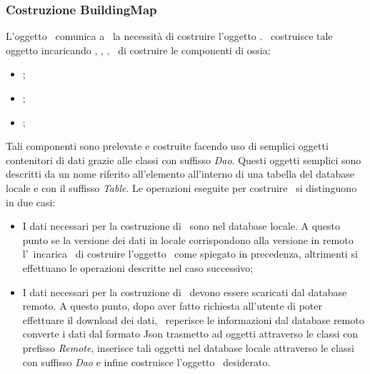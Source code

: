 \documentclass[../Funzionalita.tex]{subfiles}
\begin{document}
		\newpage	
		\subsubsection{Costruzione BuildingMap}
			L'oggetto \InformationManagerImp\ comunica a \DatabaseService\ la necessità di costruire l'oggetto \BuildingMap. \DatabaseService\ costruisce tale oggetto incaricando \PointOfInterestService, \RegionOfInterestService, \EdgeService, \PhotoService\ di costruire le componenti di \BuildingMap ossia:
			\begin{itemize}
				\item \PointOfInterest;
				\item \RegionOfInterest;
				\item \EnrichedEdge;
			\end{itemize}
			Tali componenti sono prelevate e costruite facendo uso di semplici oggetti contenitori di dati grazie alle classi con suffisso \textit{Dao}. Questi oggetti semplici sono descritti da un nome riferito all'elemento all'interno di una tabella del database locale e con il suffisso \textit{Table}. 
			Le operazioni eseguite per costruire \BuildingMap\ si distinguono in due casi:
			\begin{itemize}
				\item I dati necessari per la costruzione di \BuildingMap\ sono nel database locale. A questo punto se la versione dei dati in locale corrispondono alla versione in remoto l'\InformationManagerImp\ incarica \DatabaseService\ di costruire l'oggetto \BuildingMap\ come spiegato in precedenza, altrimenti si effettuano le operazioni descritte nel caso successivo;
				\item I dati necessari per la costruzione di \BuildingMap\ devono essere scaricati dal database remoto. A questo punto, dopo aver fatto richiesta all'utente di poter effettuare il download dei dati, \DatabaseService\ reperisce le informazioni dal database remoto converte i dati dal formato Json trasmetto ad oggetti attraverso le classi con prefisso \textit{Remote}, inserisce tali oggetti nel database locale attraverso le classi con suffisso \textit{Dao} e infine costruisce l'oggetto \BuildingMap\ desiderato.
			\end{itemize}
			
			
\end{document}
